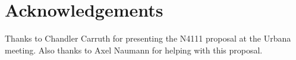 \section{Acknowledgements}

Thanks to Chandler Carruth for presenting the N4111 proposal at the Urbana meeting.
Also thanks to Axel Naumann for helping with this proposal.
